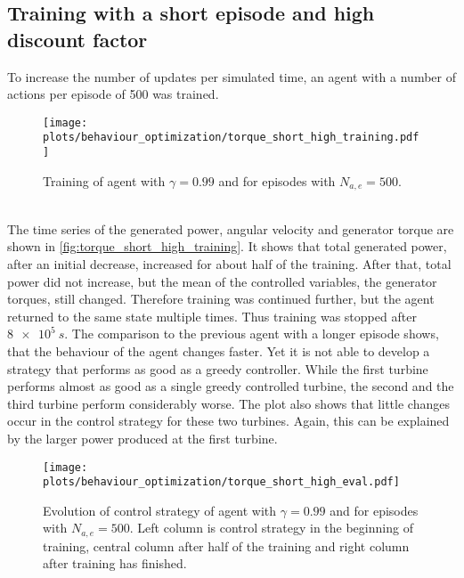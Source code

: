 \subsection{Training with a short episode and high discount factor}
To increase the number of updates per simulated time, an agent with a number of actions per episode of 500 was trained.  
\begin{figure}[h]
	\centering
	\texttt{[image: plots/behaviour\_optimization/torque\_short\_high\_training.pdf]}
	\caption{Training of agent with $\gamma=0.99$ and for episodes with $N_{a,e}=500$.}
	\label{fig:torque_short_high_training}
\end{figure}\\
The time series of the generated power, angular velocity and generator torque are shown in \autoref{fig:torque_short_high_training}. It shows that total generated power, after an initial decrease, increased for about half of the training. After that, total power did not increase, but the mean of the controlled variables, the generator torques, still changed. Therefore training was continued further, but the agent returned to the same state multiple times. Thus training was stopped after $\SI{8e5}{s}$. The comparison to the previous agent with a longer episode shows, that the behaviour of the agent changes faster. Yet it is not able to develop a strategy that performs as good as a greedy controller. While the first turbine performs almost as good as a single greedy controlled turbine, the second and the third turbine perform considerably worse. The plot also shows that little changes occur in the control strategy for these two turbines. Again, this can be explained by the larger power produced at the first turbine. 
\begin{figure}[h]
	\centering
	\texttt{[image: plots/behaviour\_optimization/torque\_short\_high\_eval.pdf]}
	\caption{Evolution of control strategy of agent with $\gamma=0.99$ and for episodes with $N_{a,e}=500$. Left column is control strategy in the beginning of training, central column after half of the training and right column after training has finished.}
	\label{fig:torque_short_high_eval}
\end{figure}
